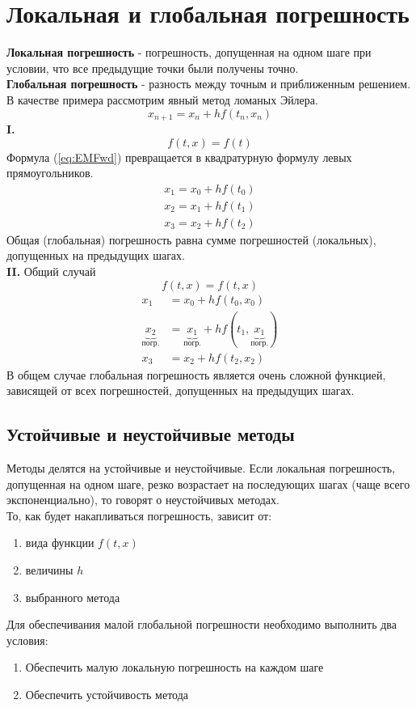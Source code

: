 \documentclass[a4paper,11pt]{article}
\begin{document}
\section{Локальная и глобальная погрешность}
\textbf{Локальная погрешность} - погрешность, допущенная на одном шаге при условии, что все предыдущие точки были получены точно. \\
\textbf{Глобальная погрешность} - разность между точным и приближенным решением. \\
В качестве примера рассмотрим явный метод ломаных Эйлера.
\begin{equation}
  x_{n+1} = x_n + hf(t_n, x_n)
  \label{eq:EMFwd}
\end{equation}
\textbf{I.}
\[f(t, x) = f(t)\]
Формула (\ref{eq:EMFwd}) превращается в квадратурную формулу левых прямоугольников.
\begin{gather*}
  x_1 = x_0 + hf(t_0) \\
  x_2 = x_1 + hf(t_1) \\
  x_3 = x_2 + hf(t_2)
\end{gather*}
Общая (глобальная) погрешность равна сумме погрешностей (локальных), допущенных на предыдущих шагах. \\
\textbf{II.} Общий случай
\[f(t, x) = f(t, x)\]
\begin{align*}
  x_1 &= x_0 + hf(t_0, x_0) \\
  \underbrace{x_2}_{\text{погр.}} &= \underbrace{x_1}_{\text{погр.}} + hf(t_1, \underbrace{x_1}_{\text{погр.}}) \\
  x_3 &= x_2 + hf(t_2, x_2)
\end{align*}
В общем случае глобальная погрешность является очень сложной функцией, зависящей от всех погрешностей, допущенных на предыдущих шагах.

  \subsection{Устойчивые и неустойчивые методы}
  Методы делятся на устойчивые и неустойчивые. Если локальная погрешность, допущенная на одном шаге, резко возрастает на последующих шагах (чаще всего экспоненциально),
    то говорят о неустойчивых методах. \\
  То, как будет накапливаться погрешность, зависит от:
  \begin{enumerate}
    \item вида функции $f(t, x)$
    \item величины $h$
    \item выбранного метода
  \end{enumerate}
  Для обеспечивания малой глобальной погрешности необходимо выполнить два условия:
  \begin{enumerate}
    \item Обеспечить малую локальную погрешность на каждом шаге
    \item Обеспечить устойчивость метода
  \end{enumerate}
\end{document}
